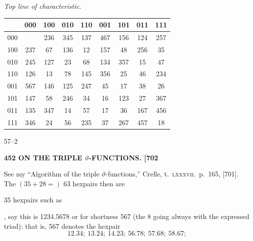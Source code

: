 \documentclass[11pt]{article}
\begin{document}
\begin{center}
\textit{Top line of characteristic.}\\[2pt]
\begin{tabular}{|c||c|c|c|c|c|c|c|c|}
\hline
     & 000 & 100 & 010 & 110 & 001 & 101 & 011 & 111 \\
\hline\hline
000  &     & 236 & 345 & 137 & 467 & 156 & 124 & 257 \\
\hline
100  & 237 & 67  & 136 & 12  & 157 & 48  & 256 & 35 \\
\hline
010  & 245 & 127 & 23  & 68  & 134 & 357 & 15  & 47 \\
\hline
110  & 126 & 13  & 78  & 145 & 356 & 25  & 46  & 234 \\
\hline
001  & 567 & 146 & 125 & 247 & 45  & 17  & 38  & 26 \\
\hline
101  & 147 & 58  & 246 & 34  & 16  & 123 & 27  & 367 \\
\hline
011  & 135 & 347 & 14  & 57  & 17  & 36  & 167 & 456 \\
\hline
111  & 346 & 24  & 56  & 235 & 37  & 267 & 457 & 18 \\
\hline
\end{tabular}
\end{center}

\hfill 57--2

\bigskip
\noindent\textbf{452 \hfill ON THE TRIPLE $\vartheta$-FUNCTIONS. \hfill [702}

\medskip

See my ``Algorithm of the triple $\vartheta$-functions,'' Crelle, t.~\textsc{lxxxvii}.~p.~165, [701]. The $(35 + 28 =)$ 63 hexpairs then are

\medskip

35 hexpairs such as
\quad
{},
say this is 1234.5678 or for shortness 567 (the 8 going always with the expressed triad): that is, 567 denotes the hexpair
\[
12.34;\ 13.24;\ 14.23;\ 56.78;\ 57.68;\ 58.67;
\]
\end{document}
